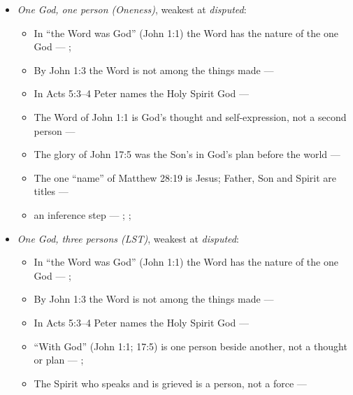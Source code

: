 \documentclass[11pt,paper=\testimonypaper,DIV=13,parskip=false]{scrartcl}
\begin{document}
\begin{itemize}
\item \emph{One God, one person (Oneness)}, weakest at \emph{disputed}:
\begin{itemize}
\item In “the Word was God” (John 1:1) the Word has the nature of the one God --- \cite{harner-qualitative-anarthrous-1973}; \cite[3, The Triune God]{kibbey-living-systematic-theology-2026}
\item By John 1:3 the Word is not among the things made --- \cite[Tractates on John I.11]{schaff-nicene-post-nicene-fathers-1-7}
\item In Acts 5:3–4 Peter names the Holy Spirit God --- \cite[198]{calvin-commentary-acts-1844}
\item The Word of John 1:1 is God’s thought and self-expression, not a second person --- \cite[ch. 4 and 8, on John 1:1]{bernard-oneness-of-god-1983}
\item The glory of John 17:5 was the Son’s in God’s plan before the world --- \cite[ch. 8, The Preexistence of Jesus]{bernard-oneness-of-god-1983}
\item The one “name” of Matthew 28:19 is Jesus; Father, Son and Spirit are titles --- \cite[ch. 6, Matthew 28:19]{bernard-oneness-of-god-1983}
\item an inference step --- \cite[3, The Triune God]{kibbey-living-systematic-theology-2026}; \cite[ch. 4, Conclusion]{bernard-oneness-of-god-1983}; \cite[17--19]{buzzard-caveat-lector-2001}
\end{itemize}
\item \emph{One God, three persons (LST)}, weakest at \emph{disputed}:
\begin{itemize}
\item In “the Word was God” (John 1:1) the Word has the nature of the one God --- \cite{harner-qualitative-anarthrous-1973}; \cite[3, The Triune God]{kibbey-living-systematic-theology-2026}
\item By John 1:3 the Word is not among the things made --- \cite[Tractates on John I.11]{schaff-nicene-post-nicene-fathers-1-7}
\item In Acts 5:3–4 Peter names the Holy Spirit God --- \cite[198]{calvin-commentary-acts-1844}
\item “With God” (John 1:1; 17:5) is one person beside another, not a thought or plan --- \cite[3, The Triune God]{kibbey-living-systematic-theology-2026}; \cite[27]{watchtower-should-you-believe-trinity-1989}
\item The Spirit who speaks and is grieved is a person, not a force --- \cite[3, The Triune God]{kibbey-living-systematic-theology-2026}

\end{itemize}
\end{itemize}
\end{document}
